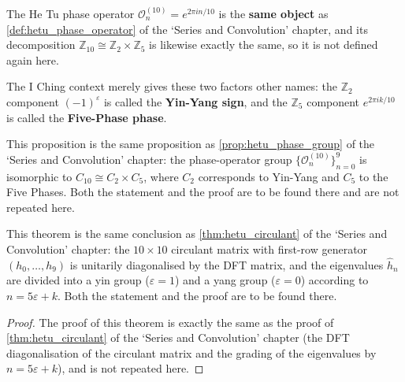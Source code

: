 \begin{remark}\label{def:hetu_phase_operator_yijing}
The He Tu phase operator $\mathcal{O}_n^{(10)} = e^{2\pi i n / 10}$ is the \textbf{same object} as \cref{def:hetu_phase_operator} of the `Series and Convolution' chapter, and its decomposition $\mathbb{Z}_{10} \cong \mathbb{Z}_2 \times \mathbb{Z}_5$ is likewise exactly the same, so it is not defined again here.

The I Ching context merely gives these two factors other names: the $\mathbb{Z}_2$ component $(-1)^{\varepsilon}$ is called the \textbf{Yin-Yang sign}, and the $\mathbb{Z}_5$ component $e^{2\pi i k / 10}$ is called the \textbf{Five-Phase phase}.
\end{remark}

\begin{remark}\label{prop:hetu_phase_group_yijing}
This proposition is the same proposition as \cref{prop:hetu_phase_group} of the `Series and Convolution' chapter: the phase-operator group $\{\mathcal{O}_n^{(10)}\}_{n=0}^{9}$ is isomorphic to $C_{10} \cong C_2 \times C_5$, where $C_2$ corresponds to Yin-Yang and $C_5$ to the Five Phases. Both the statement and the proof are to be found there and are not repeated here.
\end{remark}

\begin{remark}\label{thm:hetu_circulant_yijing}
This theorem is the same conclusion as \cref{thm:hetu_circulant} of the `Series and Convolution' chapter: the $10\times 10$ circulant matrix with first-row generator $(h_0,\dots,h_9)$ is unitarily diagonalised by the DFT matrix, and the eigenvalues $\hat h_n$ are divided into a yin group ($\varepsilon=1$) and a yang group ($\varepsilon=0$) according to $n = 5\varepsilon + k$. Both the statement and the proof are to be found there.
\end{remark}

\begin{proof}
The proof of this theorem is exactly the same as the proof of \cref{thm:hetu_circulant} of the `Series and Convolution' chapter (the DFT diagonalisation of the circulant matrix and the grading of the eigenvalues by $n = 5\varepsilon + k$), and is not repeated here.
\end{proof}


